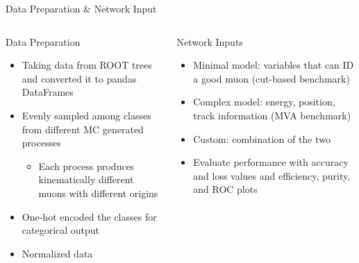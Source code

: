 \documentclass[10pt,handout]{beamer}
\begin{document}
\begin{frame}{Data Preparation \& Network Input}
\begin{columns}
\begin{column}{0.5\textwidth}
Data Preparation
\begin{itemize}
\item Taking data from ROOT trees and converted it to pandas DataFrames
\item Evenly sampled among classes from different MC generated processes
\begin{itemize}
\item Each process produces kinematically different muons with different origins
\end{itemize}
\item One-hot encoded the classes for categorical output
\item Normalized data
\end{itemize}
\end{column}

\begin{column}{0.5\textwidth}
Network Inputs
\begin{itemize}
\item Minimal model: variables that can ID a good muon (cut-based benchmark)
\item Complex model: energy, position, track information (MVA benchmark)
\item Custom: combination of the two
\item Evaluate performance with accuracy and loss values and efficiency, purity, and ROC plots
\end{itemize}
\end{column}
\end{columns}
\end{frame}
\end{document}
